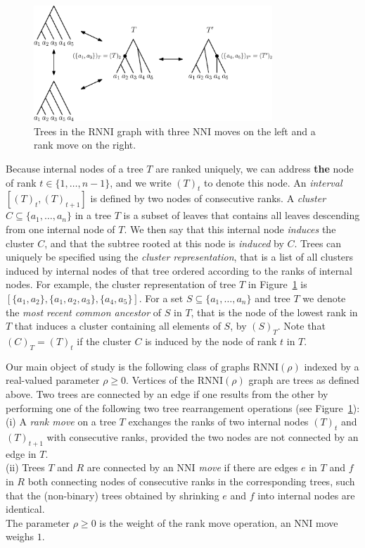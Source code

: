 \documentclass[11pt]{amsart}
\newcommand{\rnni}{\mathrm{RNNI}}
\newcommand{\nni}{\mathrm{NNI}}
\begin{document}
\begin{figure}[ht]
\centering
\includegraphics[width=0.8\textwidth]{ranked_trees_ex}
\caption{Trees in the $\rnni$ graph with three $\nni$ moves on the left and a rank move on the right.}
\label{fig:ranked_trees_ex}
\end{figure}

Because internal nodes of a tree $T$ are ranked uniquely, we can address \textbf{the} node of rank ${t \in \{1, \ldots, n - 1\}}$, and we write $(T)_t$ to denote this node.
An \emph{interval} $[(T)_t,(T)_{t+1}]$ is defined by two nodes of consecutive ranks.
A \emph{cluster} $C \subseteq \{a_1, \ldots, a_n\}$ in a tree $T$ is a subset of leaves that contains all leaves descending from one internal node of $T$.
We then say that this internal node \emph{induces} the cluster $C$, and that the subtree rooted at this node is \emph{induced} by $C$.
Trees can uniquely be specified using the \emph{cluster representation}, that is a list of all clusters induced by internal nodes of that tree ordered according to the ranks of internal nodes.
For example, the cluster representation of tree $T$ in Figure~\ref{fig:ranked_trees_ex} is $[\{a_1, a_2\}, \{a_1, a_2, a_3\}, \{a_4, a_5\}]$.
For a set $S \subseteq \{a_1, \ldots, a_n\}$ and tree $T$ we denote the \emph{most recent common ancestor} of $S$ in $T$, that is the node of the lowest rank in $T$ that induces a cluster containing all elements of $S$, by $(S)_T$.
Note that $(C)_T = (T)_t$ if the cluster $C$ is induced by the node of rank $t$ in $T$.

Our main object of study is the following class of graphs $\rnni(\rho)$ indexed by a real-valued parameter $\rho \geq 0$.
Vertices of the $\rnni(\rho)$ graph are trees as defined above.
Two trees are connected by an edge if one results from the other by performing one of the following two tree rearrangement operations (see Figure~\ref{fig:ranked_trees_ex}):\\
(i) A \emph{rank move} on a tree $T$ exchanges the ranks of two internal nodes $(T)_t$ and $(T)_{t+1}$ with consecutive ranks, provided the two nodes are not connected by an edge in $T$.\\
(ii) Trees $T$ and $R$ are connected by an \emph{$\nni$ move} if there are edges $e$ in $T$ and $f$ in $R$ both connecting nodes of consecutive ranks in the corresponding trees, such that the (non-binary) trees obtained by shrinking $e$ and $f$ into internal nodes are identical.\\
The parameter $\rho \geq 0$ is the weight of the rank move operation, an $\nni$ move weighs $1$.
\end{document}
